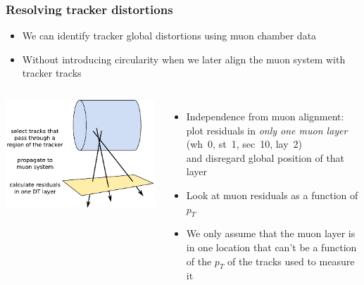 \documentclass[compress]{beamer}
\begin{document}
\begin{frame}
\frametitle{Resolving tracker distortions}

\begin{itemize}
\item We can identify tracker global distortions using muon chamber data
\item Without introducing circularity when we later align the muon system with tracker tracks
\end{itemize}

\vspace{0.1 cm}
\begin{columns}
\includegraphics[width=\linewidth]{method.pdf}

\begin{itemize}
\item Independence from muon alignment: plot residuals in {\it only one muon layer} \\ (wh~0, st~1, sec~10, lay~2) \\ and disregard global position of that layer

\item Look at muon residuals as a function of $p_T$

\item We only assume that the muon layer is in one location that can't be a function of the $p_T$ of the tracks used to measure it
\end{itemize}
\end{columns}

\end{frame}
\end{document}
